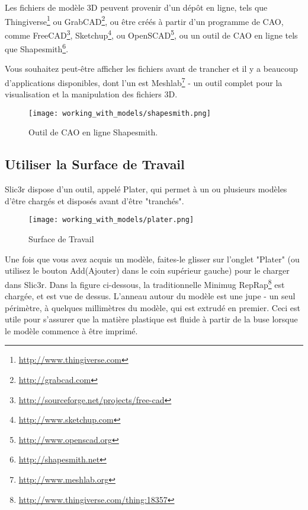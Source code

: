 Les fichiers de mod\`ele 3D peuvent provenir d'un d\'ep\^ot en ligne, tels que Thingiverse\footnote{\url{http://www.thingiverse.com}} ou GrabCAD\footnote{\url{http://grabcad.com}}, ou \^etre cr\'e\'es \`a partir d'un programme de CAO, comme FreeCAD\footnote{\url{http://sourceforge.net/projects/free-cad}}, Sketchup\footnote{\url{http://www.sketchup.com}}, ou OpenSCAD\footnote{\url{http://www.openscad.org}}, ou un outil de CAO en ligne tels que Shapesmith\footnote{\url{http://shapesmith.net}}.

Vous souhaitez peut-\^etre afficher les fichiers avant de trancher et il y a beaucoup d'applications disponibles, dont l'un est Meshlab\footnote{\url{http://www.meshlab.org}} - un outil complet pour la visualisation et la manipulation des fichiers 3D.

\begin{figure}[H]
\centering
\texttt{[image: working\_with\_models/shapesmith.png]}
\caption{Outil de CAO en ligne Shapesmith.}
\label{fig:shapesmith}
\end{figure}



\subsection{Utiliser la Surface de Travail} %
\label{sub:working_with_plater}
Slic3r dispose d'un outil, appel\'e Plater, qui permet \`a un ou plusieurs mod\`eles d'\^etre charg\'es et dispos\'es avant d'\^etre "tranch\'es".

\begin{figure}[H]
\centering
\texttt{[image: working\_with\_models/plater.png]}
\caption{Surface de Travail}
\label{fig:plater}
\end{figure}


Une fois que vous avez acquis un mod\`ele, faites-le glisser sur l'onglet "Plater" (ou utilisez le bouton Add(Ajouter) dans le coin sup\'erieur gauche) pour le charger dans Slic3r. Dans la figure ci-dessous, la traditionnelle Minimug RepRap\footnote{\url{http://www.thingiverse.com/thing:18357}} est chargée, et est vue de dessus. L'anneau autour du modèle est une jupe - un seul périmètre, à quelques millimètres du modèle, qui est extrudé en premier. Ceci est utile pour s'assurer que la matière plastique est fluide à partir de la buse lorsque le modèle commence à être imprimé.

